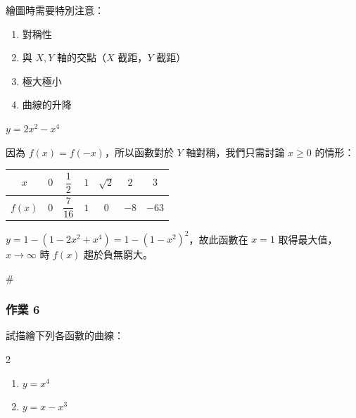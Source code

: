 繪圖時需要特別注意：
\begin{enumerate}[label=(\arabic*), leftmargin=2em]
  \item 對稱性
  \item 與 $X, Y$ 軸的交點（$X$ 截距，$Y$ 截距）
  \item 極大極小
  \item 曲線的升降
\end{enumerate}

\begin{example}\label{ex:b6s-2-7}
$y = 2x^2 - x^4$
\end{example}

因為 $f(x)=f(-x)$，所以函數對於 $Y$ 軸對稱，我們只需討論 $x \ge 0$ 的情形：

\begin{center}
\small
\renewcommand{\arraystretch}{1.2}
\begin{tabular}{|c|c|c|c|c|c|c|}
\hline
$x$ & $0$ & $\dfrac{1}{2}$ & $1$ & $\sqrt{2}$ & $2$ & $3$ \\ \hline
$f(x)$ & $0$ & $\dfrac{7}{16}$ & $1$ & $0$ & $-8$ & $-63$ \\ \hline
\end{tabular}
\end{center}

$y = 1 - (1-2x^2+x^4) = 1 - (1-x^2)^2$，故此函數在 $x=1$ 取得最大值，$x \longrightarrow \infty$ 時 $f(x)$ 趨於負無窮大。

\begin{figure}[H]
\centering
{}
\end{figure}
\hfill$\#$

\subsubsection*{作業 6}\label{hw:b6s-2-6}
試描繪下列各函數的曲線：
\begin{multicols}{2}
\begin{enumerate}[label=(\roman*)]
  \item $y = x^4$
  \item $y = x - x^3$
\end{enumerate}
\end{multicols}

